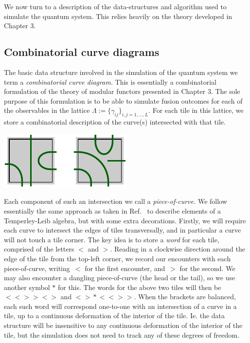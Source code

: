 We now turn to a description of the data-structures and algorithm
used to simulate the quantum system.
This relies heavily on the theory developed in Chapter 3.

%
%

\subsection{Combinatorial curve diagrams}

The basic data structure involved in the
simulation of the quantum system
we term a \emph{combinatorial curve diagram.}
This is essentially a combinatorial formulation of the
theory of modular functors presented in Chapter 3.
The sole purpose of this formulation is to
be able to simulate fusion outcomes for each of the observables in the
lattice $\Lambda := \bigl\{ \gamma_{ij} \bigr\}_{i,j=1,...,L}.$
For each tile in this lattice,
we store a combinatorial
description of the curve(s) intersected with that tile.
\begin{center}
\includegraphics[]{pic-cells.pdf}
\end{center}
Each component of such an intersection we call a \emph{piece-of-curve.}
We follow essentially the same approach as taken in Ref.~\cite{Abramsky2007} 
to describe elements of a Temperley-Leib algebra, but
with some extra decorations.
Firstly, we will require each curve to intersect 
the edges of tiles transversally,
and in particular a curve will not touch a tile corner.
The key idea is to store a \emph{word} for each tile, comprised of
the letters $\bigl<$ and $\bigr>$.
Reading in a clockwise direction around the edge of
the tile from the top-left corner,
we record our encounters with each piece-of-curve,
writing~$\bigl<$ for the first encounter, and~$\bigr>$ for the
second.
We may also encounter a dangling piece-of-curve
(the head or the tail), so we use another symbol $*$ for this.
The words for the above two tiles will then be 
$\bigl<\bigl<\bigr>\bigr>\bigl<\bigr>$ and $\bigl<\bigr>*\bigl<\bigl<\bigr>\bigr>.$
When the brackets are balanced,
each such word will correspond one-to-one with an intersection
of a curve in a tile, up to a continuous deformation of the interior of the tile.
Ie. the data structure 
will be insensitive to any continuous deformation of the interior of the tile,
but the simulation does not need to track any of these degrees of freedom.


